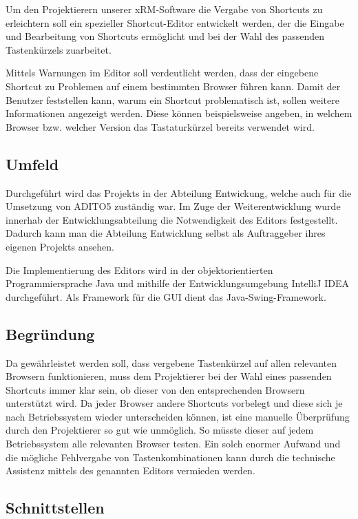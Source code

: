 Um den Projektierern unserer xRM-Software die Vergabe von Shortcuts zu erleichtern soll ein spezieller Shortcut-Editor entwickelt werden, der die Eingabe und Bearbeitung von Shortcuts ermöglicht und bei der Wahl des passenden Tastenkürzels zuarbeitet.

Mittels Warnungen im Editor soll verdeutlicht werden, dass der eingebene Shortcut zu Problemen auf einem bestimmten Browser führen kann.
Damit der Benutzer feststellen kann, warum ein Shortcut problematisch ist, sollen weitere Informationen angezeigt werden. Diese können beispielsweise angeben, in welchem Browser bzw. welcher Version das Tastaturkürzel bereits verwendet wird.

\subsection{Umfeld}

Durchgeführt wird das Projekts in der Abteilung Entwickung, welche auch für die Umsetzung von ADITO5 zuständig war. Im Zuge der Weiterentwicklung wurde innerhab der Entwicklungsabteilung die Notwendigkeit des Editors festgestellt. Dadurch kann man die Abteilung Entwicklung selbst als Auftraggeber ihres eigenen Projekts ansehen.

Die Implementierung des Editors wird in der objektorientierten Programmiersprache Java und mithilfe der Entwicklungsumgebung IntelliJ IDEA durchgeführt. Als Framework für die GUI dient das Java-Swing-Framework.

\subsection{Begründung}

Da gewährleistet werden soll, dass vergebene Tastenkürzel auf allen relevanten Browsern funktionieren, muss dem Projektierer bei der Wahl eines passenden Shortcuts immer klar sein, ob dieser von den entsprechenden Browsern unterstützt wird. Da jeder Browser andere Shortcuts vorbelegt und diese sich je nach Betriebssystem wieder unterscheiden können, ist eine manuelle Überprüfung durch den Projektierer so gut wie unmöglich. So müsste dieser auf jedem Betriebssystem alle relevanten Browser testen. Ein solch enormer Aufwand und die mögliche Fehlvergabe von Tastenkombinationen kann durch die technische Assistenz mittels des genannten Editors vermieden werden.

\subsection{Schnittstellen}
\label{schnittstellen} 

